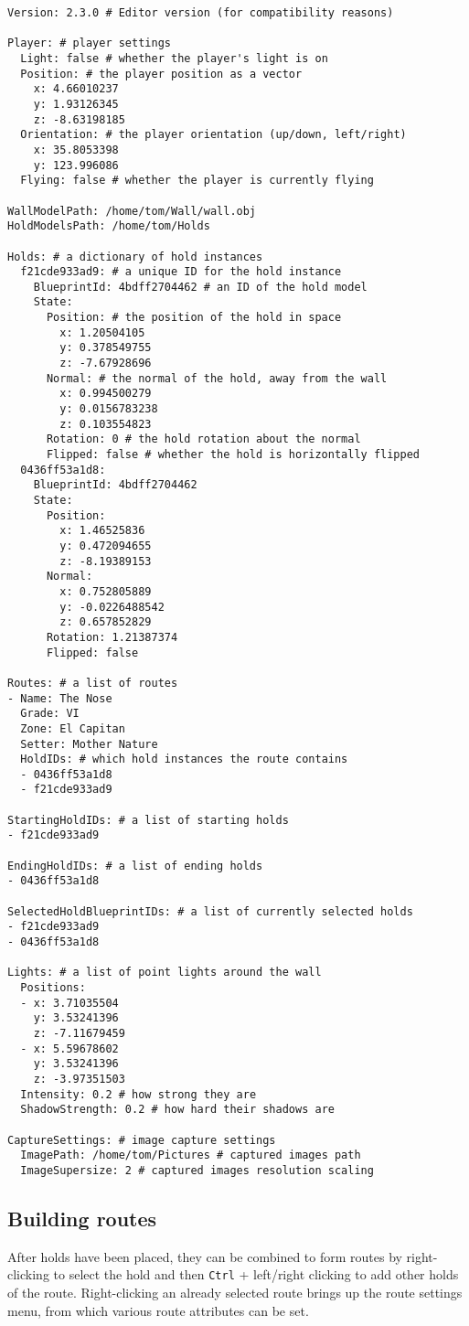 \begin{verbatim}
Version: 2.3.0 # Editor version (for compatibility reasons)

Player: # player settings
  Light: false # whether the player's light is on
  Position: # the player position as a vector
    x: 4.66010237
    y: 1.93126345
    z: -8.63198185
  Orientation: # the player orientation (up/down, left/right)
    x: 35.8053398
    y: 123.996086
  Flying: false # whether the player is currently flying

WallModelPath: /home/tom/Wall/wall.obj
HoldModelsPath: /home/tom/Holds

Holds: # a dictionary of hold instances
  f21cde933ad9: # a unique ID for the hold instance
    BlueprintId: 4bdff2704462 # an ID of the hold model
    State:
      Position: # the position of the hold in space
        x: 1.20504105
        y: 0.378549755
        z: -7.67928696
      Normal: # the normal of the hold, away from the wall
        x: 0.994500279
        y: 0.0156783238
        z: 0.103554823
      Rotation: 0 # the hold rotation about the normal
      Flipped: false # whether the hold is horizontally flipped
  0436ff53a1d8:
    BlueprintId: 4bdff2704462
    State:
      Position:
        x: 1.46525836
        y: 0.472094655
        z: -8.19389153
      Normal:
        x: 0.752805889
        y: -0.0226488542
        z: 0.657852829
      Rotation: 1.21387374
      Flipped: false

Routes: # a list of routes
- Name: The Nose
  Grade: VI
  Zone: El Capitan
  Setter: Mother Nature
  HoldIDs: # which hold instances the route contains
  - 0436ff53a1d8
  - f21cde933ad9

StartingHoldIDs: # a list of starting holds
- f21cde933ad9

EndingHoldIDs: # a list of ending holds
- 0436ff53a1d8

SelectedHoldBlueprintIDs: # a list of currently selected holds
- f21cde933ad9
- 0436ff53a1d8

Lights: # a list of point lights around the wall
  Positions:
  - x: 3.71035504
    y: 3.53241396
    z: -7.11679459
  - x: 5.59678602
    y: 3.53241396
    z: -3.97351503
  Intensity: 0.2 # how strong they are
  ShadowStrength: 0.2 # how hard their shadows are

CaptureSettings: # image capture settings
  ImagePath: /home/tom/Pictures # captured images path
  ImageSupersize: 2 # captured images resolution scaling
\end{verbatim}

\subsection{Building routes}
After holds have been placed, they can be combined to form routes by right-clicking to select the hold and then \verb|Ctrl| + left/right clicking to add other holds of the route.
Right-clicking an already selected route brings up the route settings menu, from which various route attributes can be set.

